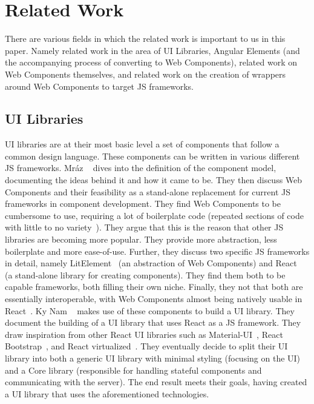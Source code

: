 \chapter{Related Work}\label{chap:related-work}

There are various fields in which the related work is important to us in this paper. Namely related work in the area of UI Libraries, Angular Elements (and the accompanying process of converting to Web Components), related work on Web Components themselves, and related work on the creation of wrappers around Web Components to target JS frameworks.

\section{UI Libraries}
UI libraries are at their most basic level a set of components that follow a common design language. These components can be written in various different JS frameworks. Mráz \etal{}~\cite{mrazcomponent} dives into the definition of the component model, documenting the ideas behind it and how it came to be. They then discuss Web Components and their feasibility as a stand-alone replacement for current JS frameworks in component development. They find Web Components to be cumbersome to use, requiring a lot of boilerplate code (repeated sections of code with little to no variety~\cite{inproceedings}). They argue that this is the reason that other JS libraries are becoming more popular. They provide more abstraction, less boilerplate and more ease-of-use. Further, they discuss two specific JS frameworks in detail, namely LitElement~ (an abstraction of Web Components) and React~ (a stand-alone library for creating components). They find them both to be capable frameworks, both filling their own niche. Finally, they not that both are essentially interoperable, with Web Components almost being natively usable in React~.
Ky Nam \etal{}~\cite{ky2019ui} makes use of these components to build a UI library. They document the building of a UI library that uses React as a JS framework. They draw inspiration from other React UI libraries such as Material-UI~, React Bootstrap~, and React virtualized~. They eventually decide to split their UI library into both a generic UI library with minimal styling (focusing on the UI) and a Core library (responsible for handling stateful components and communicating with the server). The end result meets their goals, having created a UI library that uses the aforementioned technologies.
